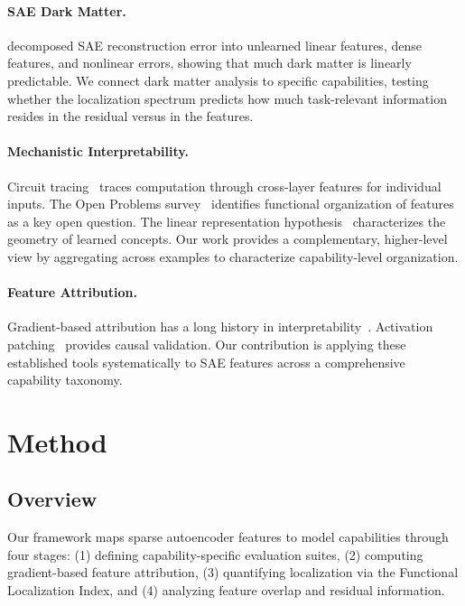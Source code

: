 \documentclass{article}
\begin{document}
\paragraph{SAE Dark Matter.}
\citet{engels2025decomposing} decomposed SAE reconstruction error into unlearned linear features, dense features, and nonlinear errors, showing that much dark matter is linearly predictable. We connect dark matter analysis to specific capabilities, testing whether the localization spectrum predicts how much task-relevant information resides in the residual versus in the features.

\paragraph{Mechanistic Interpretability.}
Circuit tracing~\citep{lindsey2025circuit} traces computation through cross-layer features for individual inputs. The Open Problems survey~\citep{sharkey2025open} identifies functional organization of features as a key open question. The linear representation hypothesis~\citep{park2024linear} characterizes the geometry of learned concepts. Our work provides a complementary, higher-level view by aggregating across examples to characterize capability-level organization.

\paragraph{Feature Attribution.}
Gradient-based attribution has a long history in interpretability~\citep{sundararajan2017axiomatic}. Activation patching~\citep{meng2022locating} provides causal validation. Our contribution is applying these established tools systematically to SAE features across a comprehensive capability taxonomy.

\section{Method}
\label{sec:method}

\subsection{Overview}

Our framework maps sparse autoencoder features to model capabilities through four stages: (1) defining capability-specific evaluation suites, (2) computing gradient-based feature attribution, (3) quantifying localization via the Functional Localization Index, and (4) analyzing feature overlap and residual information.
\end{document}
